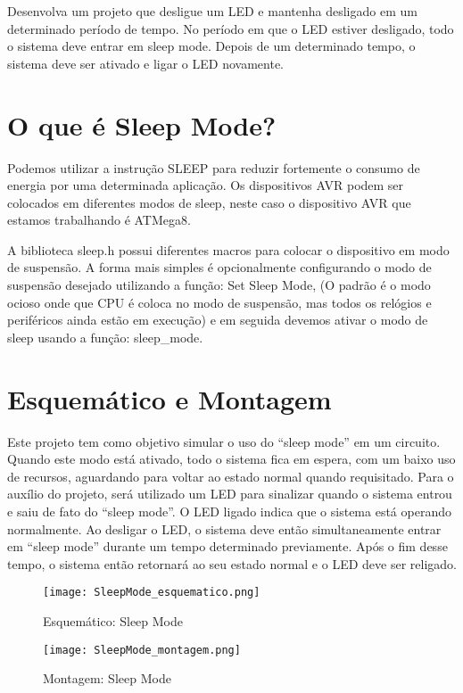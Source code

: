 
Desenvolva um projeto que desligue um LED e mantenha desligado em um determinado período de tempo. No período em que o LED estiver
desligado, todo o sistema deve entrar em sleep mode. Depois de um determinado tempo, o sistema deve ser ativado e ligar o LED novamente.


\section{O que é Sleep Mode?}

Podemos utilizar a instrução SLEEP para reduzir fortemente o consumo de energia por uma determinada aplicação. Os dispositivos AVR podem ser colocados em diferentes modos de sleep, neste caso o dispositivo AVR que estamos trabalhando é ATMega8.

A biblioteca sleep.h possui diferentes macros para colocar o dispositivo em modo de suspensão. A forma mais simples é opcionalmente configurando o modo de suspensão desejado utilizando a função: Set Sleep Mode, (O padrão é o modo ocioso  onde que CPU é coloca no modo de suspensão, mas todos os relógios e periféricos ainda estão em execução) e em seguida devemos ativar o modo de sleep usando a função: sleep_mode.

\section{Esquemático e Montagem}

Este projeto tem como objetivo simular o uso do “sleep mode” em um circuito. Quando este modo está ativado, todo o sistema fica em espera, com um baixo uso de recursos, aguardando para voltar ao estado normal quando requisitado. Para o auxílio do projeto, será utilizado um LED para sinalizar quando o sistema entrou e saiu de fato do “sleep mode”. O LED ligado indica que o sistema está operando normalmente. Ao desligar o LED, o sistema deve então simultaneamente entrar em “sleep mode” durante um tempo determinado previamente. Após o fim desse tempo, o sistema então retornará ao seu estado normal e o LED deve ser religado.

\begin{figure}[htb]
 \caption{Esquemático: Sleep Mode}
 \label{fig:Esquemático: Sleep Mode}
 \centering
 \texttt{[image: SleepMode\_esquematico.png]}
 \fautor
\end{figure}

\begin{figure}[htb]
 \caption{Montagem: Sleep Mode}
 \label{fig:Montagem: Sleep Mode}
 \centering
 \texttt{[image: SleepMode\_montagem.png]}
 \fautor
\end{figure}

